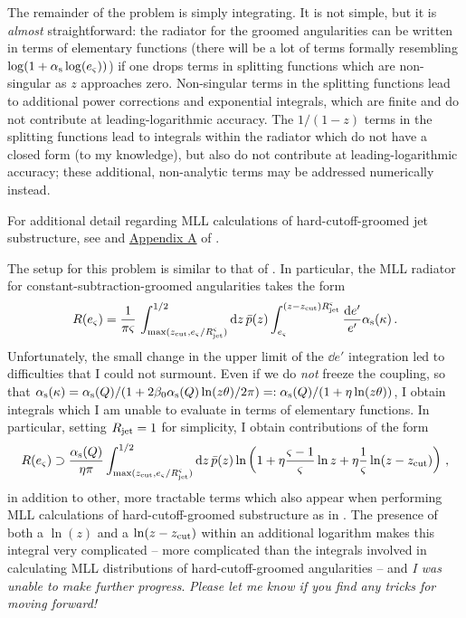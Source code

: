 The remainder of the problem is simply integrating.
%
It is not simple, but it is \textit{almost} straightforward:
%
the radiator for the groomed angularities can be written in terms of elementary functions (there will be a lot of terms formally resembling \(\log(1 + \alpha_{\mathrm{s}}\log(e_\varsigma))\)) if one drops terms in splitting functions which are non-singular as \(z\) approaches zero.
%
Non-singular terms in the splitting functions lead to additional power corrections and exponential integrals, which are finite and do not contribute at leading-logarithmic accuracy.
%
The \(1/(1-z)\) terms in the splitting functions lead to integrals within the radiator which do not have a closed form (to my knowledge), but also do not contribute at leading-logarithmic accuracy;
%
these additional, non-analytic terms may be addressed numerically instead.

For additional detail regarding MLL calculations of hard-cutoff-groomed jet substructure, see  and \href{https://arxiv.org/pdf/1402.2657\#appendix.A}{Appendix A} of .


The setup for this problem is similar to that of .
%
In particular, the MLL radiator for constant-subtraction-groomed angularities takes the form
\begin{align}
    R(e_\varsigma)
    =
    \frac{1}{\pi \varsigma}
    \,
    \int_{\max(z_{\rm cut}, e_\varsigma/R_\text{jet}^\varsigma)}^{1/2}
    \dd z\, \bar{p}(z)
    \int_{e_\varsigma}^{(z-z_{\rm cut}) R_\text{jet}^\varsigma}
    \frac{\dd e'}{e'}
    \alpha_{\mathrm{s}}(\kappa)
    \,.
\end{align}
Unfortunately, the small change in the upper limit of the \(\dd e'\) integration led to difficulties that I could not surmount.
%
Even if we do \textit{not} freeze the coupling, so that \(\alpha_{\mathrm{s}}(\kappa) = \alpha_{\mathrm{s}}(Q) / (1 + 2 \beta_0 \alpha_{\mathrm{s}}(Q) \ln(z\theta) / 2\pi) =: \alpha_{\mathrm{s}}(Q) / (1 + \eta \ln(z\theta))\), I obtain integrals which I am unable to evaluate in terms of elementary functions.
%
In particular, setting \(R_\text{jet} = 1\) for simplicity, I obtain contributions of the form
\begin{align}
    R(e_\varsigma)
    \supset
    \frac{\alpha_{\mathrm{s}}(Q)}{\eta\pi}
    \int_{\max(z_{\rm cut}, e_\varsigma/R_\text{jet}^\varsigma)}^{1/2}
    \dd z\, \bar{p}(z)
    \ln\left(1 + \eta\frac{\varsigma - 1}{\varsigma} \ln z + \eta\frac{1}{\varsigma}\ln(z-z_{\rm cut})\right)
    \,,
\end{align}
in addition to other, more tractable terms which also appear when performing MLL calculations of hard-cutoff-groomed substructure as in .
%
The presence of both a \(\ln(z)\) and a \(\ln(z-z_{\rm cut})\) within an additional logarithm makes this integral very complicated -- more complicated than the integrals involved in calculating MLL distributions of hard-cutoff-groomed angularities -- and \textit{I was unable to make further progress}.
%
\textit{Please let me know if you find any tricks for moving forward!}



